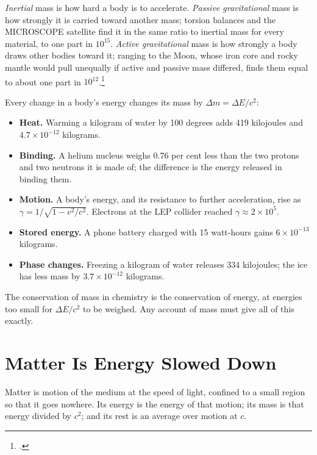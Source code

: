 \documentclass[11pt,a4paper]{article}
\newcommand{\fn}[1]{\footnote{\citealp{#1}.}}
\begin{document}
 \emph{Inertial} mass is how hard a body is to accelerate. \emph{Passive gravitational} mass is how strongly it is carried toward another mass; torsion balances and the MICROSCOPE satellite find it in the same ratio to inertial mass for every material, to one part in $10^{15}$. \emph{Active gravitational} mass is how strongly a body draws other bodies toward it; ranging to the Moon, whose iron core and rocky mantle would pull unequally if active and passive mass differed, finds them equal to about one part in $10^{12}$.\fn{bartlett1986}

 Every change in a body's energy changes its mass by $\Delta m = \Delta E/c^2$:
\begin{itemize}
\item \textbf{Heat.} Warming a kilogram of water by 100 degrees adds 419 kilojoules and $4.7\times10^{-12}$ kilograms.
\item \textbf{Binding.} A helium nucleus weighs 0.76 per cent less than the two protons and two neutrons it is made of; the difference is the energy released in binding them.
\item \textbf{Motion.} A body's energy, and its resistance to further acceleration, rise as $\gamma = 1/\sqrt{1-v^2/c^2}$. Electrons at the LEP collider reached $\gamma \approx 2\times10^5$.
\item \textbf{Stored energy.} A phone battery charged with 15 watt-hours gains $6\times10^{-13}$ kilograms.
\item \textbf{Phase changes.} Freezing a kilogram of water releases 334 kilojoules; the ice has less mass by $3.7\times10^{-12}$ kilograms.
\end{itemize}
The conservation of mass in chemistry is the conservation of energy, at energies too small for $\Delta E/c^2$ to be weighed. Any account of mass must give all of this exactly.

\section{Matter Is Energy Slowed Down}
\label{sec:slowed}

\begin{hypbar}
Matter is motion of the medium at the speed of light, confined to a small region so that it goes nowhere. Its energy is the energy of that motion; its mass is that energy divided by $c^2$; and its rest is an average over motion at $c$.
\end{hypbar}
\end{document}
